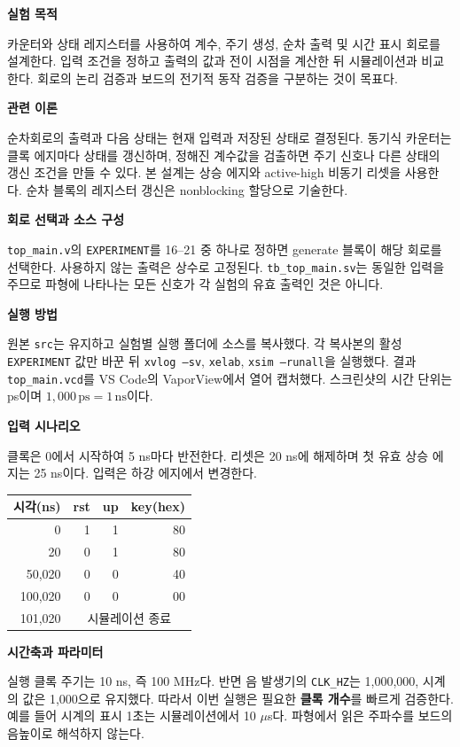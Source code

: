 \documentclass[a4paper,10pt]{article}
\begin{document}
\textbf{실험 목적}\par
카운터와 상태 레지스터를 사용하여 계수, 주기 생성, 순차 출력 및 시간 표시 회로를 설계한다.
입력 조건을 정하고 출력의 값과 전이 시점을 계산한 뒤 시뮬레이션과 비교한다.
회로의 논리 검증과 보드의 전기적 동작 검증을 구분하는 것이 목표다.

\textbf{관련 이론}\par
순차회로의 출력과 다음 상태는 현재 입력과 저장된 상태로 결정된다.
동기식 카운터는 클록 에지마다 상태를 갱신하며, 정해진 계수값을 검출하면
주기 신호나 다른 상태의 갱신 조건을 만들 수 있다\cite{mano}.
본 설계는 상승 에지와 active-high 비동기 리셋을 사용한다.
순차 블록의 레지스터 갱신은 nonblocking 할당으로 기술한다.

\textbf{회로 선택과 소스 구성}\par
\texttt{top\_main.v}의 \texttt{EXPERIMENT}를 16--21 중 하나로 정하면
generate 블록이 해당 회로를 선택한다. 사용하지 않는 출력은 상수로 고정된다.
\texttt{tb\_top\_main.sv}는 동일한 입력을 주므로 파형에 나타나는 모든 신호가
각 실험의 유효 출력인 것은 아니다.

\textbf{실행 방법}\par
원본 \texttt{src}는 유지하고 실험별 실행 폴더에 소스를 복사했다.
각 복사본의 활성 \texttt{EXPERIMENT} 값만 바꾼 뒤
\texttt{xvlog --sv}, \texttt{xelab}, \texttt{xsim --runall}을 실행했다.
결과 \texttt{top\_main.vcd}를 VS Code의 VaporView에서 열어 캡처했다.
스크린샷의 시간 단위는 ps이며 $1{,}000\,\mathrm{ps}=1\,\mathrm{ns}$이다.
\par\noindent
\textbf{입력 시나리오}\par
클록은 0에서 시작하여 5 ns마다 반전한다. 리셋은 20 ns에 해제하며
첫 유효 상승 에지는 25 ns이다. 입력은 하강 에지에서 변경한다.
\begin{center}\small
\begin{tabular}{rrrr}\toprule
시각(ns) & rst & up & key(hex)\\\midrule
0 & 1 & 1 & 80\\
20 & 0 & 1 & 80\\
50,020 & 0 & 0 & 40\\
100,020 & 0 & 0 & 00\\
101,020 & \multicolumn{3}{c}{시뮬레이션 종료}\\\bottomrule
\end{tabular}\end{center}

\textbf{시간축과 파라미터}\par
실행 클록 주기는 10 ns, 즉 100 MHz다.
반면 음 발생기의 \texttt{CLK\_HZ}는 1,000,000,
시계의 값은 1,000으로 유지했다.
따라서 이번 실행은 필요한 \textbf{클록 개수}를 빠르게 검증한다.
예를 들어 시계의 표시 1초는 시뮬레이션에서 10 $\mu$s다.
파형에서 읽은 주파수를 보드의 음높이로 해석하지 않는다.
\end{document}
